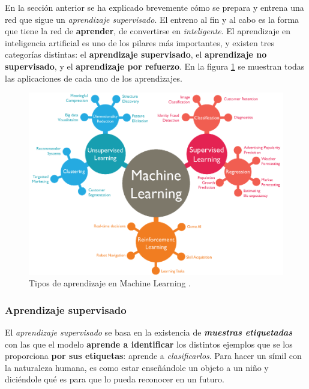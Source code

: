 En la sección anterior se ha explicado brevemente cómo se prepara y entrena una red que sigue un \textit{aprendizaje supervisado}. El entreno al fin y al cabo es la forma que tiene la red de \textbf{aprender}, de convertirse en \textit{inteligente}. El aprendizaje en inteligencia artificial es uno de los pilares más importantes, y existen tres categorías distintas: el \textbf{aprendizaje supervisado}, el \textbf{aprendizaje no supervisado}, y el \textbf{aprendizaje por refuerzo}. En la figura \ref{fig:ml_tipos_aprendizaje} se muestran todas las aplicaciones de cada uno de los aprendizajes. 
 
\begin{figure}[h]
    \centering
    \includegraphics[scale=0.5]{cap2_contextualizacion/images/ml_learning.png}
    \caption{Tipos de aprendizaje en Machine Learning \cite{chugh2008mltypes}.}
    \label{fig:ml_tipos_aprendizaje}
\end{figure}


\subsubsection{Aprendizaje supervisado}

El \textit{aprendizaje supervisado} se basa en la existencia de \textbf{\textit{muestras etiquetadas}} con las que el modelo \textbf{aprende a identificar} los distintos ejemplos que se los proporciona \textbf{por sus etiquetas}: aprende a \textit{clasificarlos}. Para hacer un símil con la naturaleza humana, es como estar enseñándole un objeto a un niño  y diciéndole qué es para que lo pueda reconocer en un futuro. \\

